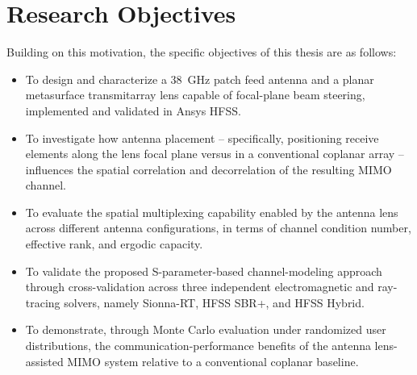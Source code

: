 

\section{Research Objectives}
Building on this motivation, the specific objectives of this thesis are as follows:
\begin{itemize}
    \item To design and characterize a 38~GHz patch feed antenna and a planar metasurface transmitarray lens capable of focal-plane beam steering, implemented and validated in Ansys HFSS.
    \item To investigate how antenna placement -- specifically, positioning receive elements along the lens focal plane versus in a conventional coplanar array -- influences the spatial correlation and decorrelation of the resulting MIMO channel.
    \item To evaluate the spatial multiplexing capability enabled by the antenna lens across different antenna configurations, in terms of channel condition number, effective rank, and ergodic capacity.
    \item To validate the proposed S-parameter-based channel-modeling approach through cross-validation across three independent electromagnetic and ray-tracing solvers, namely Sionna-RT, HFSS SBR+, and HFSS Hybrid.
    \item To demonstrate, through Monte Carlo evaluation under randomized user distributions, the communication-performance benefits of the antenna lens-assisted MIMO system relative to a conventional coplanar baseline.
\end{itemize}

